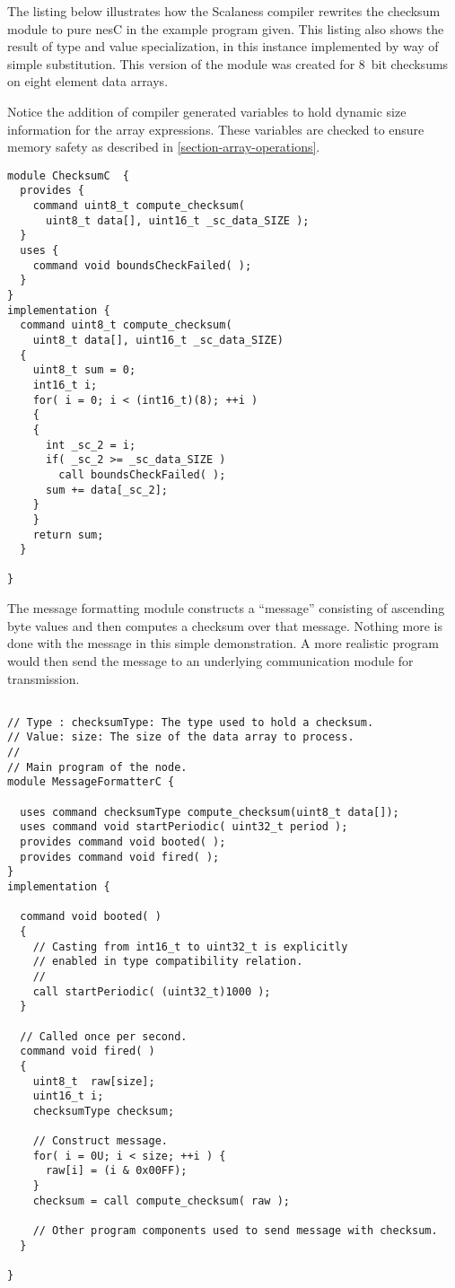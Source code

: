 The listing below illustrates how the Scalaness compiler rewrites the checksum module to pure
nesC in the example program given. This listing also shows the result of type and value
specialization, in this instance implemented by way of simple substitution. This version of the
module was created for 8~bit checksums on eight element data arrays.

Notice the addition of compiler generated variables to hold dynamic size information for the
array expressions. These variables are checked to ensure memory safety as described in
\autoref{section-array-operations}.

\singlespace
\vspace{1.0ex}
\begin{lstlisting}[language=nesC]
module ChecksumC  {
  provides {
    command uint8_t compute_checksum(
      uint8_t data[], uint16_t _sc_data_SIZE );
  }
  uses {
    command void boundsCheckFailed( );
  }
}
implementation {
  command uint8_t compute_checksum(
    uint8_t data[], uint16_t _sc_data_SIZE) 
  {
    uint8_t sum = 0;
    int16_t i;
    for( i = 0; i < (int16_t)(8); ++i )
    {
    {
      int _sc_2 = i;
      if( _sc_2 >= _sc_data_SIZE )
        call boundsCheckFailed( );
      sum += data[_sc_2];
    }
    }
    return sum;
  }

}
\end{lstlisting}
\vspace{1.0ex}
\primaryspacing

The message formatting module constructs a ``message'' consisting of ascending byte values and
then computes a checksum over that message. Nothing more is done with the message in this simple
demonstration. A more realistic program would then send the message to an underlying
communication module for transmission.

\singlespace
\vspace{1.0ex}
\begin{lstlisting}[language=nesC]

// Type : checksumType: The type used to hold a checksum.
// Value: size: The size of the data array to process.
//
// Main program of the node.
module MessageFormatterC {
    
  uses command checksumType compute_checksum(uint8_t data[]);
  uses command void startPeriodic( uint32_t period );
  provides command void booted( );
  provides command void fired( );
}
implementation {
    
  command void booted( )
  {
    // Casting from int16_t to uint32_t is explicitly
    // enabled in type compatibility relation.
    //
    call startPeriodic( (uint32_t)1000 );
  }
    
  // Called once per second.
  command void fired( )
  {
    uint8_t  raw[size];
    uint16_t i;
    checksumType checksum;
        
    // Construct message.
    for( i = 0U; i < size; ++i ) {
      raw[i] = (i & 0x00FF);
    }
    checksum = call compute_checksum( raw );
        
    // Other program components used to send message with checksum.
  }
    
}
\end{lstlisting}
\vspace{1.0ex}
\primaryspacing

